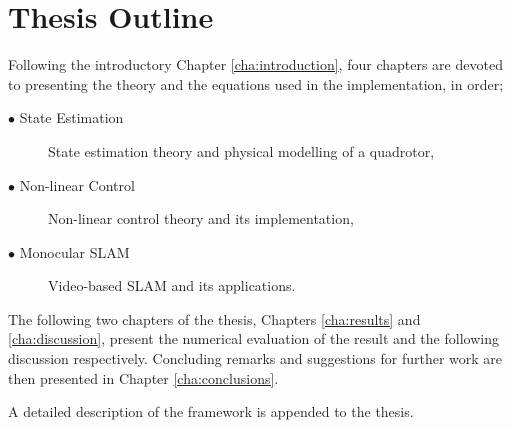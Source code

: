 \section{Thesis Outline}
    Following the introductory Chapter \ref{cha:introduction}, four chapters
    are devoted to presenting the theory and the equations used in the implementation, in order;
    \begin{description}
        \item[$\bullet$ State Estimation] State estimation theory and physical modelling of a quadrotor,
        \item[$\bullet$ Non-linear Control]  Non-linear control theory and its implementation,
        \item[$\bullet$ Monocular SLAM] Video-based SLAM and its applications.
    \end{description}

    The following two chapters of the thesis, Chapters \ref{cha:results} and \ref{cha:discussion}, present the
    numerical evaluation of the result and the following discussion respectively.
    Concluding remarks and suggestions for further work are then presented in Chapter \ref{cha:conclusions}.

    A detailed description of the \crap framework is appended to the thesis.
